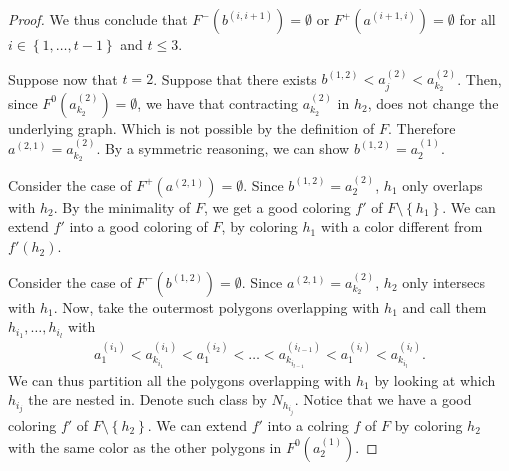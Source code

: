 \documentclass[12pt]{article}
\theoremstyle{definition}
\begin{document}
\begin{proof}
         We thus conclude that
         $F^{-}\left(b^{\left(i, i+1\right)}\right) = \emptyset$ 
         or $F^{+}\left(a^{\left(i+1, i\right)}\right) = \emptyset$
         for all
         $i \in \left\{1, \ldots, t-1\right\}$ and
         $t \leq 3$.

         Suppose now that $t = 2$.
         Suppose that there exists
         $b^{\left(1,2\right)} < 
         a_{j}^{\left(2\right)} <
         a_{k_2}^{\left(2\right)}$.
         Then, since $F^{0}\left(a_{k_2}^{\left(2\right)}\right) = 
         \emptyset$, we have that 
         contracting $a_{k_2}^{\left(2\right)}$
         in $h_2$, does not change the underlying 
         graph. Which is not possible by
         the definition of $F$.
         Therefore $a^{\left(2,1\right)} =
         a_{k_2}^{\left(2\right)}$. By a
         symmetric reasoning, we can show
         $b^{\left(1, 2\right)} = a_2^{\left(1\right)}$.
         
         Consider the case of
         $F^{+}\left(a^{\left(2, 1\right)}\right) = \emptyset$.
         Since $b^{\left(1, 2\right)} =
         a_{2}^{\left(2\right)}$, $h_1$ only
         overlaps with $h_2$.
         By the minimality of $F$, 
         we get a good coloring 
         $f'$ of $F \setminus \left\{h_1\right\}$.
         We can extend $f'$ into 
         a good coloring of $F$,
         by coloring $h_1$ with 
         a color different from
         $f'\left(h_2\right)$.

         Consider the case of
         $F^{-}\left(b^{\left(1, 2\right)}\right) = \emptyset$.
         Since $a^{\left(2, 1\right)} = 
         a_{k_2}^{\left(2\right)}$,
         $h_2$ only intersecs with $h_1$.
         Now, take the outermost polygons
         overlapping with $h_1$ and
         call them $h_{i_1}, \ldots, h_{i_{l}}$ with
         \begin{gather*}
             a_1^{\left(i_1\right)} <
             a_{k_{i_1}}^{\left(i_1\right)} <
             a_1^{\left(i_2\right)} < 
             \ldots <
             a_{k_{i_{l - 1}}}^{\left(i_{l - 1}\right)} <
             a_1^{\left(i_{l}\right)} <
             a_{k_{i_{l}}}^{\left(i_{l}\right)}.
         \end{gather*}
         We can thus partition all the
         polygons overlapping with
         $h_1$ by looking at which $h_{i_{j}}$ 
         the are nested in. Denote
         such class by $N_{h_{i_{j}}}$.
         Notice that we have a good coloring
         $f'$ of $F \setminus \left\{h_2\right\}$.
         We can extend $f'$ into a colring
         $f$ of $F$ by coloring $h_2$ with
         the same color as the other polygons in
         $F^{0}\left(a_2^{\left(1\right)}\right)$.


\end{proof}
\end{document}
